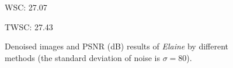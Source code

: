 \begin{figure}[t!]
{\begin{minipage}[t]{0.19\textwidth}
{\footnotesize WSC: 27.07}
\end{minipage}
\begin{minipage}[t]{0.19\textwidth}
\centering
{}
{\footnotesize TWSC: 27.43}
\end{minipage}
}\vspace{-3mm}
    \caption{Denoised images and PSNR (dB) results of \textsl{Elaine} by different methods (the standard deviation of noise is $\sigma=80$).}
    \label{fig5-5}
\end{figure}

